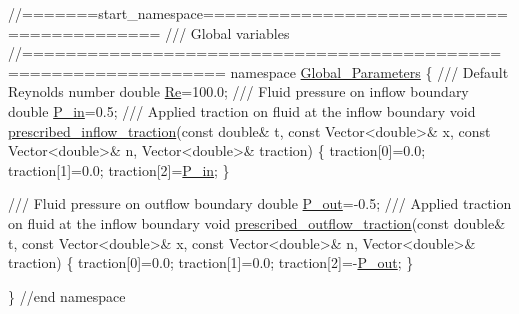  
\begin{DoxyCodeInclude}
\textcolor{comment}{//=======start\_namespace==========================================}
\textcolor{comment}{/// Global variables}
\textcolor{comment}{}\textcolor{comment}{//================================================================}
\textcolor{keyword}{namespace }\hyperlink{namespaceGlobal__Parameters}{Global\_Parameters}
\{
\textcolor{comment}{}
\textcolor{comment}{ /// Default Reynolds number}
\textcolor{comment}{} \textcolor{keywordtype}{double} \hyperlink{namespaceGlobal__Parameters_a9d72e94a9305c6a310940a6a427ebe06}{Re}=100.0;
\textcolor{comment}{}
\textcolor{comment}{ /// Fluid pressure on inflow boundary}
\textcolor{comment}{} \textcolor{keywordtype}{double} \hyperlink{namespaceGlobal__Parameters_a05b26d00935600b5e0149872844f224c}{P\_in}=0.5;
\textcolor{comment}{}
\textcolor{comment}{ /// Applied traction on fluid at the inflow boundary}
\textcolor{comment}{} \textcolor{keywordtype}{void} \hyperlink{namespaceGlobal__Parameters_af7faf65214ed9ead637f7c208addb095}{prescribed\_inflow\_traction}(\textcolor{keyword}{const} \textcolor{keywordtype}{double}& t,
                                 \textcolor{keyword}{const} Vector<double>& x,
                                 \textcolor{keyword}{const} Vector<double>& n,
                                 Vector<double>& traction)
 \{
  traction[0]=0.0;
  traction[1]=0.0;
  traction[2]=\hyperlink{namespaceGlobal__Parameters_a05b26d00935600b5e0149872844f224c}{P\_in};
 \} 

\textcolor{comment}{}
\textcolor{comment}{ /// Fluid pressure on outflow boundary}
\textcolor{comment}{} \textcolor{keywordtype}{double} \hyperlink{namespaceGlobal__Parameters_ac680ed856897793d54c9c867da19169c}{P\_out}=-0.5; 
\textcolor{comment}{}
\textcolor{comment}{ /// Applied traction on fluid at the inflow boundary}
\textcolor{comment}{} \textcolor{keywordtype}{void} \hyperlink{namespaceGlobal__Parameters_a83155358b144cff7e29ecb6b209a2d3e}{prescribed\_outflow\_traction}(\textcolor{keyword}{const} \textcolor{keywordtype}{double}& t,
                                  \textcolor{keyword}{const} Vector<double>& x,
                                  \textcolor{keyword}{const} Vector<double>& n,
                                  Vector<double>& traction)
 \{
  traction[0]=0.0;
  traction[1]=0.0;
  traction[2]=-\hyperlink{namespaceGlobal__Parameters_ac680ed856897793d54c9c867da19169c}{P\_out};
 \} 
 
\} \textcolor{comment}{//end namespace}

\end{DoxyCodeInclude}




